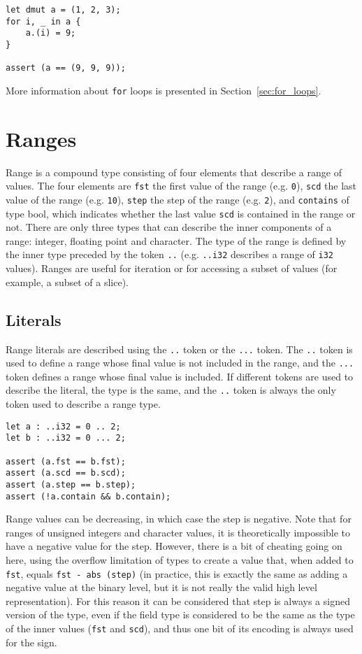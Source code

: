 \begin{lstlisting}[style=coloredverbatim]
let dmut a = (1, 2, 3);
for i, _ in a {
    a.(i) = 9;
}

assert (a == (9, 9, 9));
\end{lstlisting}

More information about \texttt{for} loops is presented in Section~\ref{sec:for_loops}.

\section {Ranges}%
\label{sec:range_type}

Range is a compound type consisting of four elements that describe a range of
values. The four elements are \texttt{fst} the first value of the range (e.g.
\texttt{0}), \texttt{scd} the last value of the range (e.g. \texttt{10}),
\texttt{step} the step of the range (e.g. \texttt{2}), and \texttt{contains} of
type bool, which indicates whether the last value \texttt{scd} is contained in
the range or not. There are only three types that can describe the inner
components of a range: integer, floating point and character. The type of the
range is defined by the inner type preceded by the token \texttt{..} (e.g.
\texttt{..i32} describes a range of \texttt{i32} values). Ranges are useful for
iteration or for accessing a subset of values (for example, a subset of a
slice).

\subsection {Literals}

Range literals are described using the \texttt{..} token or the \texttt{...}
token. The \texttt{..} token is used to define a range whose final value is not
included in the range, and the \texttt{...} token defines a range whose final
value is included. If different tokens are used to describe the literal, the
type is the same, and the \texttt{..} token is always the only token used to
describe a range type.

\begin{lstlisting}[style=coloredverbatim]
let a : ..i32 = 0 .. 2;
let b : ..i32 = 0 ... 2;

assert (a.fst == b.fst);
assert (a.scd == b.scd);
assert (a.step == b.step);
assert (!a.contain && b.contain);
\end{lstlisting}

Range values can be decreasing, in which case the step is negative. Note that
for ranges of unsigned integers and character values, it is theoretically
impossible to have a negative value for the step. However, there is a bit of
cheating going on here, using the overflow limitation of types to create a value
that, when added to \texttt{fst}, equals \texttt{fst - abs (step)} (in practice,
this is exactly the same as adding a negative value at the binary level, but it
is not really the valid high level representation). For this reason it can be
considered that step is always a signed version of the type, even if the field
type is considered to be the same as the type of the inner values (\texttt{fst}
and \texttt{scd}), and thus one bit of its encoding is always used for the sign.

